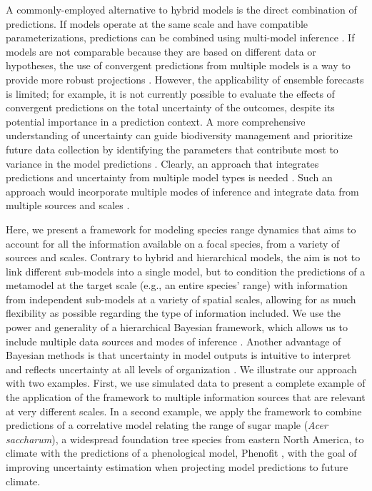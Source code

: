 \documentclass[11pt]{article}
\begin{document}
A commonly-employed alternative to hybrid models is the direct combination of predictions.
If models operate at the same scale and have compatible parameterizations, predictions can be combined using multi-model inference \citep[e.g., model averaging, ensemble forecasting;][]{Thuiller2004, Araujo2007}. 
If models are not comparable because they are based on different data or hypotheses, the use of convergent predictions from multiple models is a way to provide more robust projections \citep{Morin2009, Marmion2009, Cheaib2012, Serra-Diaz2013}.
However, the applicability of ensemble forecasts is limited; for example, it is not currently possible to evaluate the effects of convergent predictions on the total uncertainty of the outcomes, despite its potential importance in a prediction context.
A more comprehensive understanding of uncertainty can guide biodiversity management and prioritize future data collection by identifying the parameters that contribute most to variance in the model predictions \citep{McMahon2011}. 
Clearly, an approach that integrates predictions and uncertainty from multiple model types is needed \citep{Beck2012, Thuiller2013}. 
Such an approach would incorporate multiple modes of inference and integrate data from multiple sources and scales \citep{Levin1992, Peters2004, Thuiller2013}.

Here, we present a framework for modeling species range dynamics that aims to account for all the information available on a focal species, from a variety of sources and scales.
Contrary to hybrid and hierarchical models, the aim is not to link different sub-models into a single model, but to condition the predictions of a metamodel at the target scale (e.g., an entire species' range) with information from independent sub-models at a variety of spatial scales, allowing for as much flexibility as possible regarding the type of information included. 
We use the power and generality of a hierarchical Bayesian framework, which allows us to include multiple data sources and modes of inference \citep{VanOijen2005, Clark2006, Hobbs2011, Hartig2012}. 
Another advantage of Bayesian methods is that uncertainty in model outputs is intuitive to interpret and reflects uncertainty at all levels of organization \citep{Cressie2009, Hobbs2011}. 
We illustrate our approach with two examples.
First, we use simulated data to present a complete example of the application of the framework to multiple information sources that are relevant at very different scales.
In a second example, we apply the framework to combine predictions of a correlative model relating the range of sugar maple (\emph{Acer saccharum}), a widespread foundation tree species from eastern North America, to climate with the predictions of a phenological model, Phenofit \citep{Chuine2001}, with the goal of improving uncertainty estimation when projecting model predictions to future climate.
\end{document}
